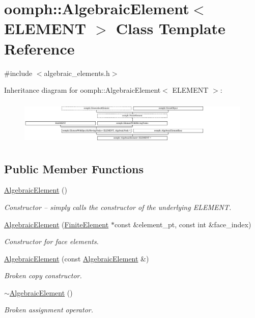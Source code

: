 \hypertarget{classoomph_1_1AlgebraicElement}{}\section{oomph\+:\+:Algebraic\+Element$<$ E\+L\+E\+M\+E\+NT $>$ Class Template Reference}
\label{classoomph_1_1AlgebraicElement}


{\ttfamily \#include $<$algebraic\+\_\+elements.\+h$>$}

Inheritance diagram for oomph\+:\+:Algebraic\+Element$<$ E\+L\+E\+M\+E\+NT $>$\+:\begin{figure}[H]
\begin{center}
\leavevmode
\includegraphics[height=2.165506cm]{classoomph_1_1AlgebraicElement}
\end{center}
\end{figure}
\subsection*{Public Member Functions}
\begin{DoxyCompactItemize}
\item 
\hyperlink{classoomph_1_1AlgebraicElement_acc029b6daf56771f0f691e9e82d3f674}{Algebraic\+Element} ()
\begin{DoxyCompactList}\small\item\em Constructor -- simply calls the constructor of the underlying E\+L\+E\+M\+E\+NT. \end{DoxyCompactList}\item 
\hyperlink{classoomph_1_1AlgebraicElement_af4ad322eea2c6fab36c1a74c18ecd781}{Algebraic\+Element} (\hyperlink{classoomph_1_1FiniteElement}{Finite\+Element} $\ast$const \&element\+\_\+pt, const int \&face\+\_\+index)
\begin{DoxyCompactList}\small\item\em Constructor for face elements. \end{DoxyCompactList}\item 
\hyperlink{classoomph_1_1AlgebraicElement_a2a0f43e92929bc56efa19ce12613c605}{Algebraic\+Element} (const \hyperlink{classoomph_1_1AlgebraicElement}{Algebraic\+Element} \&)
\begin{DoxyCompactList}\small\item\em Broken copy constructor. \end{DoxyCompactList}\item 
\hyperlink{classoomph_1_1AlgebraicElement_a46a4575a8a218302acb4753b1675fdd7}{$\sim$\+Algebraic\+Element} ()
\begin{DoxyCompactList}\small\item\em Broken assignment operator. \end{DoxyCompactList}\end{DoxyCompactItemize}
